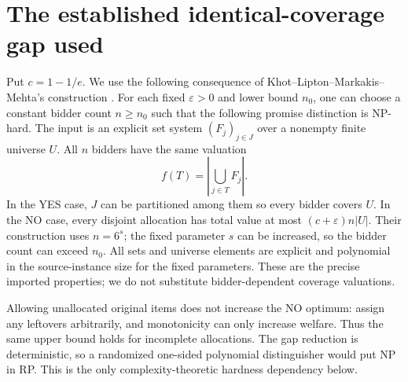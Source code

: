 \documentclass[11pt]{article}
\begin{document}
\section{The established identical-coverage gap used}
Put $c=1-1/e$. We use the following consequence of Khot--Lipton--Markakis--Mehta's construction \cite[Section 4, Lemmas 13--14 and Theorem 16]{klmm}. For each fixed $\varepsilon>0$ and lower bound $n_0$, one can choose a constant bidder count $n\ge n_0$ such that the following promise distinction is NP-hard. The input is an explicit set system $(F_j)_{j\in J}$ over a nonempty finite universe $U$. All $n$ bidders have the same valuation
\[
 f(T)=\left|\bigcup_{j\in T}F_j\right|.
\]
In the YES case, $J$ can be partitioned among them so every bidder covers $U$. In the NO case, every disjoint allocation has total value at most $(c+\varepsilon)n|U|$. Their construction uses $n=6^s$; the fixed parameter $s$ can be increased, so the bidder count can exceed $n_0$. All sets and universe elements are explicit and polynomial in the source-instance size for the fixed parameters. These are the precise imported properties; we do not substitute bidder-dependent coverage valuations.

Allowing unallocated original items does not increase the NO optimum: assign any leftovers arbitrarily, and monotonicity can only increase welfare. Thus the same upper bound holds for incomplete allocations. The gap reduction is deterministic, so a randomized one-sided polynomial distinguisher would put NP in RP. This is the only complexity-theoretic hardness dependency below.
\end{document}

